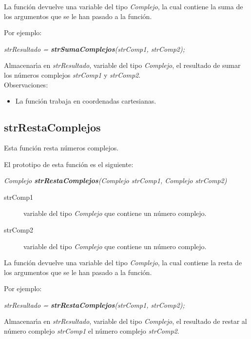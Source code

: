 La funci\'on devuelve una variable del tipo \emph{Complejo}, la cual contiene
la suma de los argumentos que se le han pasado a la funci\'on.

Por ejemplo:

\begin{center}
\emph{strResultado = \textbf{strSumaComplejos}(strComp1, strComp2);}
\end{center}

Almacenar\'{\i}a en \emph{strResultado}, variable del tipo \emph{Complejo}, el
resultado de sumar los n\'umeros complejos \emph{strComp1} y \emph{strComp2}.\\

Observaciones:

\begin{itemize}
\item La funci\'on trabaja en coordenadas cartesianas.
\end{itemize}

\subsection{strRestaComplejos}
Esta funci\'on resta n\'umeros complejos.\newline

El prototipo de esta funci\'on es el siguiente:

\begin{center}
\emph{Complejo \textbf{strRestaComplejos}(Complejo strComp1, Complejo strComp2)}
\end{center}

\begin{description}
\item[strComp1] variable del tipo \emph{Complejo} que contiene un n\'umero 
complejo.
\item[strComp2] variable del tipo \emph{Complejo} que contiene un n\'umero
complejo.
\end{description}

La funci\'on devuelve una variable del tipo \emph{Complejo}, la cual contiene
la resta de los argumentos que se le han pasado a la funci\'on.\newpage

Por ejemplo:

\begin{center}
\emph{strResultado = \textbf{strRestaComplejos}(strComp1, strComp2);}
\end{center}

Almacenar\'{\i}a en \emph{strResultado}, variable del tipo \emph{Complejo}, el
resultado de restar al n\'umero complejo \emph{strComp1} el n\'umero complejo
\emph{strComp2}. \\


